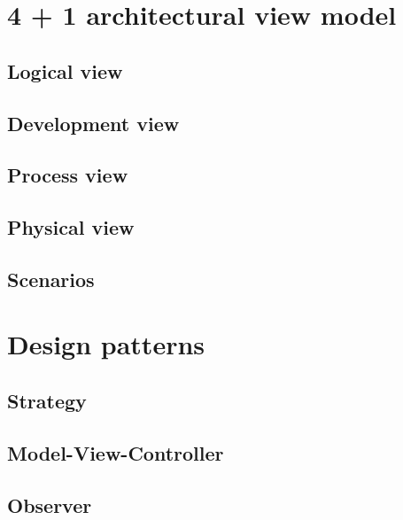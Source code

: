 
\section{4 + 1 architectural view model}
\subsection{Logical view}
\subsection{Development view}
\subsection{Process view}
\subsection{Physical view}
\subsection{Scenarios}

\section{Design patterns}
\subsection{Strategy}
\subsection{Model-View-Controller}
\subsection{Observer}